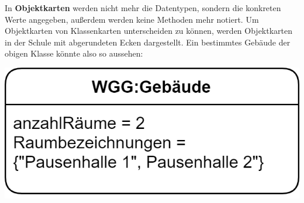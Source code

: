 \documentclass{article}
\begin{document}
In \textbf{Objektkarten} werden nicht mehr die Datentypen, sondern die konkreten Werte angegeben, außerdem werden keine Methoden mehr notiert. Um Objektkarten von Klassenkarten unterscheiden zu können, werden Objektkarten in der Schule mit abgerundeten Ecken dargestellt. Ein bestimmtes Gebäude der obigen Klasse könnte also so aussehen:
\begin{center}
    \includegraphics[scale=0.2]{media/object.png}
\end{center}
\end{document}
